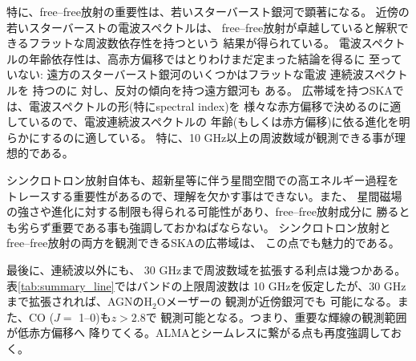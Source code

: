 特に、free--free放射の重要性は、若いスターバースト\color{red}銀河\color{black}で顕著になる。
近傍の若いスターバーストの電波スペクトルは、
free--free\color{red}放射\color{black}が卓越していると解釈できるフラットな周波数依存性を持つという
結果が得られている\citep{1993ApJ...410..626D,2003ApJ...593..733R,2005A&A...436..837H}。
電波スペクトルの年齢依存性は、高赤方偏移ではとりわけまだ定まった結論を得るに
至っていない: 遠方のスターバースト\color{red}銀河\color{black}のいくつかはフラットな電波
連続波スペクトルを
持つ\citep{2005A&A...436..837H,2006A&A...460...67H,2011MNRAS.415.3473V}のに
対し、反対の傾向を持つ遠方銀河も
ある\citep{2011MNRAS.410.1155B,2014MNRAS.442..577T}。
広帯域を持つSKAでは、電波スペクトルの形(特にspectral index)を
様々な赤方偏移で決めるのに適しているので、電波連続波スペクトルの
年齢(もしくは赤方偏移)に依る進化を明らかにするのに適している。
特に、10 GHz以上の周波数域が観測できる事が理想的である。

シンクロトロン放射自体も、超新星等に伴う星間空間での高エネルギー過程を
トレースする重要性があるので、理解を欠かす事はできない。また、
星間磁場の強さや進化に対する制限も得られる可能性があり、free--free\color{red}放射\color{black}成分に
勝るとも劣らず重要である事も強調しておかねばならない。
シンクロトロン\color{red}放射\color{black}とfree--free\color{red}放射\color{black}の両方を観測できるSKAの広帯域は、
この点でも魅力的である。

最後に、連続波以外にも、
30 GHzまで周波数域を拡張する利点は幾つかある。
表\ref{tab:summary_line}ではバンドの上限周波数は
10 GHzを仮定したが、30 GHzまで拡張されれば、AGNのH$_2$Oメーザーの
観測が近傍銀河でも
可能になる。また、CO ($J=$ 1--0)も$z>2.8$で
観測可能となる。つまり、重要な輝線の観測範囲が低赤方偏移へ
降りてくる。ALMAとシームレスに繋がる点も再度強調しておく。

